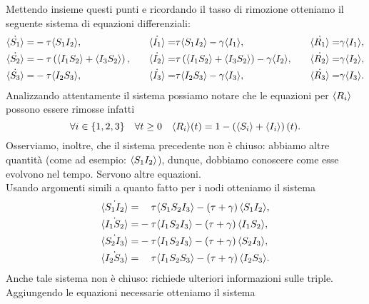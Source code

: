 Mettendo insieme questi punti e ricordando il tasso di rimozione otteniamo il seguente sistema di equazioni differenziali:
\begin{equation*}
\begin{aligned}
	\dot{\langle S_1 \rangle} = & -\tau \langle  S_1 I_2 \rangle, 
\quad &
	\dot{\langle I_1 \rangle} = & \tau \langle S_1 I_2 \rangle-\gamma \langle I_1 \rangle, 
\quad & 
	\dot{\langle R_1 \rangle} = & \gamma \langle  I_1 \rangle,
\\
	\dot{\langle S_2 \rangle} = & -\tau \left(  \langle  I_1 S_2 \rangle + \langle I_3S_2 \rangle \right),	
\quad & 
	\dot{\langle I_2 \rangle} = & \tau \left(  \langle  I_1 S_2 \rangle + \langle I_3S_2 \rangle \right)-\gamma \langle I_2 \rangle,
\quad & 
	\dot{\langle R_2 \rangle} = & \gamma \langle  I_2 \rangle,
\\
	\dot{\langle S_3 \rangle} = & -\tau \langle  I_2 S_3 \rangle,
\quad & 
	\dot{\langle I_3 \rangle} = & \tau \langle  I_2 S_3 \rangle-\gamma \langle I_3 \rangle,
\quad & 
 	\dot{\langle R_3 \rangle} = & \gamma \langle  I_3 \rangle.
\end{aligned}
\end{equation*}
Analizzando attentamente il sistema possiamo notare che le equazioni per $\langle R_i \rangle$ possono essere rimosse infatti 
$$ \forall i\in\{1, 2, 3\} \quad \forall t\geq 0 \quad \langle R_i \rangle(t) = 1 - \left( \langle S_i \rangle +\langle I_i \rangle \right)(t).$$
Osserviamo, inoltre, che il sistema precedente non \`e chiuso: abbiamo altre quantit\`a  (come ad esempio: $\langle S_1I_2 \rangle$), dunque, dobbiamo conoscere come esse evolvono nel tempo. Servono altre equazioni.\\
Usando argomenti simili a quanto fatto per i nodi otteniamo  il sistema 
\begin{equation*}
\begin{aligned}
	\dot{\angol{S_1I_2}}=&\spa\tau\angol{S_1S_2I_3} - \tonde{ \tau + \gamma}\angol{S_1 I_2},
\\
	\dot{\angol{I_1S_2}}=&-\tau\angol{I_1S_2I_3} - \tonde{ \tau + \gamma}\angol{I_1 S_2},
\\
	\dot{\angol{S_2I_3}}=&-\tau\angol{I_1S_2I_3} - \tonde{ \tau + \gamma}\angol{S_2 I_3},
\\
	\dot{\angol{I_2S_3}}=&\spa\tau\angol{I_1S_2S_3} - \tonde{ \tau + \gamma}\angol{I_2 S_3}.
	\end{aligned}
\end{equation*}
Anche tale sistema non \`e chiuso: richiede  ulteriori informazioni sulle triple.\\
Aggiungendo le equazioni necessarie otteniamo il sistema 
